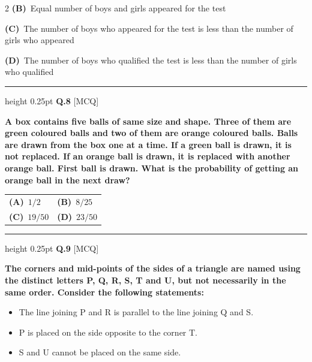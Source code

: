\documentclass[a4paper,10pt,twoside]{article}
\begin{document}
\begin{multicols}{2}
\textbf{(B)}~Equal number of boys and girls appeared for the test\par\vspace{2pt}\noindent
\textbf{(C)}~The number of boys who appeared for the test is less than the number of girls who appeared\par\vspace{2pt}\noindent
\textbf{(D)}~The number of boys who qualified the test is less than the number of girls who qualified
\par\vspace{6pt}\hrule height 0.25pt\vspace{6pt}
\noindent\textbf{Q.8} \hfill {\footnotesize\textsf{[MCQ]}}
\par\vspace{2pt}
{\bfseries A box contains five balls of same size and shape. Three of them are green coloured balls and two of them are orange coloured balls. Balls are drawn from the box one at a time. If a green ball is drawn, it is not replaced. If an orange ball is drawn, it is replaced with another orange ball.
First ball is drawn. What is the probability of getting an orange ball in the next draw? \par}
\par\vspace{2pt}\noindent
\begin{tabular*}{\columnwidth}{@{\extracolsep{\fill}}p{}p{}@{}}
\textbf{(A)}~$1/2$ & \textbf{(B)}~$8/25$ \\
\addlinespace[2pt]
\textbf{(C)}~$19/50$ & \textbf{(D)}~$23/50$
\end{tabular*}
\par\vspace{6pt}\hrule height 0.25pt\vspace{6pt}
\noindent\textbf{Q.9} \hfill {\footnotesize\textsf{[MCQ]}}
\par\vspace{2pt}
{\bfseries The corners and mid-points of the sides of a triangle are named using the distinct letters P, Q, R, S, T and U, but not necessarily in the same order. Consider the following statements:
\begin{itemize}[itemsep=0pt,topsep=2pt]
\item The line joining P and R is parallel to the line joining Q and S.
\item P is placed on the side opposite to the corner T.
\item S and U cannot be placed on the same side.
\end{itemize}
}
\end{multicols}
\end{document}
